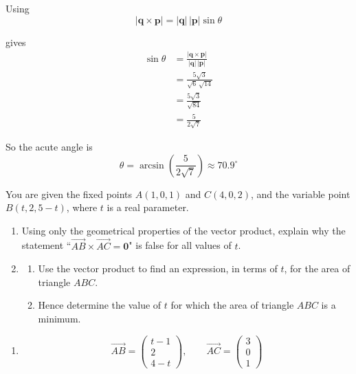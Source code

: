 \documentclass[leqno]{article}
\begin{document}
\begin{enumerate}[
  label=\textbf{\arabic*.},
  leftmargin=*,
  topsep=0pt,
  partopsep=0pt,
  parsep=0pt
]
\begin{djsSolution}
\begin{enumerate}[label=\textbf{(\alph*)}]
Using
\[
|\mathbf q\times \mathbf p|=|\mathbf q|\,|\mathbf p|\sin\theta
\]

gives
\begin{align*}
\sin\theta
&=\frac{|\mathbf q\times \mathbf p|}{|\mathbf q|\,|\mathbf p|} \\
&=\frac{5\sqrt3}{\sqrt6\,\sqrt{14}} \\
&=\frac{5\sqrt3}{\sqrt{84}} \\
&=\frac{5}{2\sqrt7}
\end{align*}

So the acute angle is
\[
\theta=\arcsin\left(\frac{5}{2\sqrt7}\right)\approx 70.9^\circ
\]
\end{enumerate}
\end{djsSolution}


\newpage

\questionitem

You are given the fixed points $A(1,0,1)$ and $C(4,0,2)$, and the variable point $B(t,2,5-t)$, where $t$ is a real parameter. \\

\begin{enumerate}[label=\textbf{(\alph*)}]
  \item Using only the geometrical properties of the vector product, explain why the statement ``$\overrightarrow{AB} \times \overrightarrow{AC} = \mathbf{0}$" is false for all values of $t$.  \\
  \item
  \begin{enumerate}[label=(\roman*)]
    \item Use the vector product to find an expression, in terms of $t$, for the area of triangle $ABC$. 
    \item Hence determine the value of $t$ for which the area of triangle $ABC$ is a minimum.  \\
  \end{enumerate}
\end{enumerate}

\vspace*{10pt}

\begin{djsSolution}
\begin{enumerate}[label=\textbf{(\alph*)}]
  \item 
  \[
  \overrightarrow{AB}=\begin{pmatrix}t-1\\2\\4-t\end{pmatrix}, \qquad \overrightarrow{AC}=\begin{pmatrix}3\\0\\1\end{pmatrix}
  \]


\end{enumerate}
\end{djsSolution}
\end{enumerate}
\end{document}
